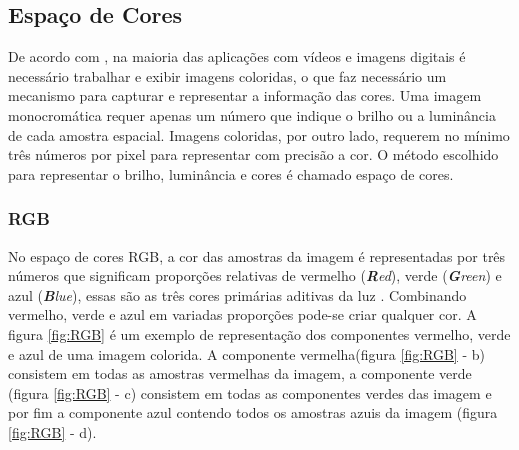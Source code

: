 \subsection{Espaço de Cores}

De acordo com , na maioria das aplicações com vídeos e imagens digitais é necessário trabalhar e exibir imagens coloridas, o que faz necessário um mecanismo para capturar e representar a informação das cores. Uma imagem monocromática requer apenas um número que indique o brilho ou a luminância de cada amostra espacial. Imagens coloridas, por outro lado, requerem no mínimo três números por pixel para representar com precisão a cor. O método escolhido para representar o brilho, luminância e cores é chamado espaço de cores.

\subsubsection{RGB}

No espaço de cores RGB, a cor das amostras da imagem é representadas por três números que significam proporções relativas de vermelho (\textit{\textbf{R}ed}), verde (\textit{\textbf{G}reen}) e azul (\textit{\textbf{B}lue}), essas são as três cores primárias aditivas da luz \cite{richardson2011h}.	Combinando vermelho, verde e azul em variadas proporções pode-se criar qualquer cor. A figura \ref{fig:RGB} é um exemplo de representação dos componentes vermelho, verde e azul de uma imagem colorida. A componente vermelha(figura \ref{fig:RGB} - b) consistem em todas as amostras vermelhas da imagem, a componente verde (figura \ref{fig:RGB} - c) consistem em todas as componentes verdes das imagem e por fim a componente azul contendo todos os amostras azuis da imagem (figura \ref{fig:RGB} - d).

